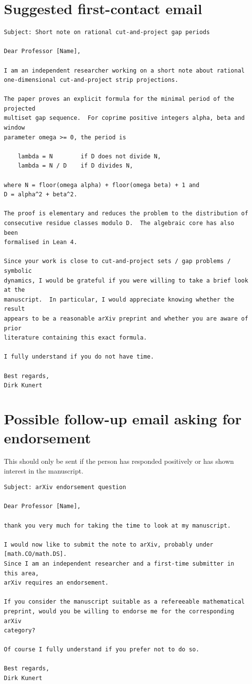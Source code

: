 \documentclass[11pt]{article}
\begin{document}
\section*{Suggested first-contact email}

\begin{verbatim}
Subject: Short note on rational cut-and-project gap periods

Dear Professor [Name],

I am an independent researcher working on a short note about rational
one-dimensional cut-and-project strip projections.

The paper proves an explicit formula for the minimal period of the projected
multiset gap sequence.  For coprime positive integers alpha, beta and window
parameter omega >= 0, the period is

    lambda = N        if D does not divide N,
    lambda = N / D    if D divides N,

where N = floor(omega alpha) + floor(omega beta) + 1 and
D = alpha^2 + beta^2.

The proof is elementary and reduces the problem to the distribution of
consecutive residue classes modulo D.  The algebraic core has also been
formalised in Lean 4.

Since your work is close to cut-and-project sets / gap problems / symbolic
dynamics, I would be grateful if you were willing to take a brief look at the
manuscript.  In particular, I would appreciate knowing whether the result
appears to be a reasonable arXiv preprint and whether you are aware of prior
literature containing this exact formula.

I fully understand if you do not have time.

Best regards,
Dirk Kunert
\end{verbatim}

\section*{Possible follow-up email asking for endorsement}

This should only be sent if the person has responded positively or has shown
interest in the manuscript.

\begin{verbatim}
Subject: arXiv endorsement question

Dear Professor [Name],

thank you very much for taking the time to look at my manuscript.

I would now like to submit the note to arXiv, probably under [math.CO/math.DS].
Since I am an independent researcher and a first-time submitter in this area,
arXiv requires an endorsement.

If you consider the manuscript suitable as a refereeable mathematical
preprint, would you be willing to endorse me for the corresponding arXiv
category?

Of course I fully understand if you prefer not to do so.

Best regards,
Dirk Kunert
\end{verbatim}
\end{document}
